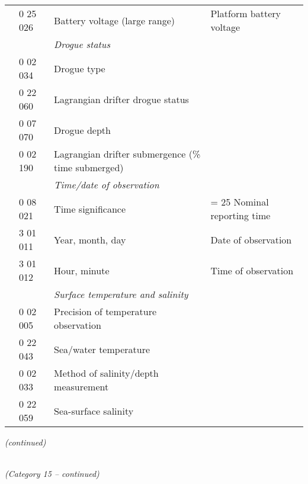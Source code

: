 \begin{longtable}[]{@{}llll@{}}
& 0 25 026 & Battery voltage (large range) & Platform battery voltage\tabularnewline
& & \emph{Drogue status} &\tabularnewline
& 0 02 034 & Drogue type &\tabularnewline
& 0 22 060 & Lagrangian drifter drogue status &\tabularnewline
& 0 07 070 & Drogue depth &\tabularnewline
& 0 02 190 & Lagrangian drifter submergence (\% time submerged) &\tabularnewline
& & \emph{Time/date of observation} &\tabularnewline
& 0 08 021 & Time significance & = 25 Nominal reporting time\tabularnewline
& 3 01 011 & Year, month, day & Date of observation\tabularnewline
& 3 01 012 & Hour, minute & Time of observation\tabularnewline
& & \emph{Surface temperature and salinity} &\tabularnewline
& 0 02 005 & Precision of temperature observation &\tabularnewline
& 0 22 043 & Sea/water temperature &\tabularnewline
& 0 02 033 & Method of salinity/depth measurement &\tabularnewline
& 0 22 059 & Sea-surface salinity &\tabularnewline
\bottomrule
\end{longtable}

\emph{(continued)}

\emph{\\
(Category 15 -- continued)}

